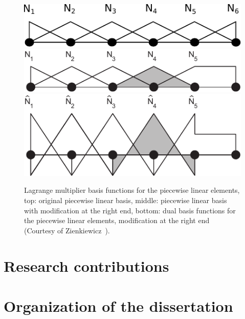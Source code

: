 \begin{figure}
  \centering
  \includegraphics[width=.7\linewidth]{original_basis}\\
  \vspace{1em}
  \includegraphics[width=.7\linewidth]{mortar_basis}\\
  \vspace{1em}
  \includegraphics[width=.7\linewidth]{dual_mortar_basis}
  \caption{Lagrange multiplier basis functions for the piecewise linear elements, top: original piecewise linear basis, middle: piecewise linear basis with modification at the right end, bottom: dual basis functions for the piecewise linear elements, modification at the right end (Courtesy of Zienkiewicz~\cite{zienkiewicz1977finite}).}\label{fig:mortar_basis}
\end{figure}

\section{Research contributions}

\section{Organization of the dissertation}